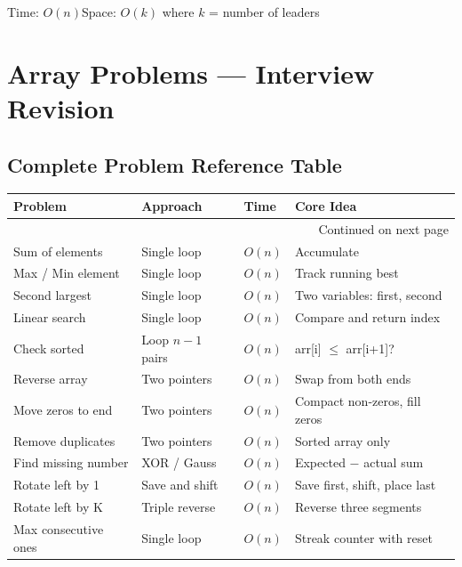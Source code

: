 \documentclass[12pt,a4paper,oneside]{book}
\begin{document}
\begin{complexity}
Time: $O(n)$\quad Space: $O(k)$ where $k$ = number of leaders
\end{complexity}

\chapter{Array Problems --- Interview Revision}

\section{Complete Problem Reference Table}

\begin{longtable}{p{4.3cm}p{2.9cm}p{2.0cm}p{4.1cm}}
\toprule
\textbf{Problem} & \textbf{Approach} & \textbf{Time} & \textbf{Core Idea}\\
\midrule
\endhead
\midrule
\multicolumn{4}{r}{\small Continued on next page}\\
\endfoot
\endlastfoot
Sum of elements          & Single loop      & $O(n)$        & Accumulate\\
Max / Min element        & Single loop      & $O(n)$        & Track running best\\
Second largest           & Single loop      & $O(n)$        & Two variables: first, second\\
Linear search            & Single loop      & $O(n)$        & Compare and return index\\
Check sorted             & Loop $n-1$ pairs & $O(n)$        & arr[i] $\leq$ arr[i+1]?\\
Reverse array            & Two pointers     & $O(n)$        & Swap from both ends\\
Move zeros to end        & Two pointers     & $O(n)$        & Compact non-zeros, fill zeros\\
Remove duplicates        & Two pointers     & $O(n)$        & Sorted array only\\
Find missing number      & XOR / Gauss      & $O(n)$        & Expected $-$ actual sum\\
Rotate left by 1         & Save and shift   & $O(n)$        & Save first, shift, place last\\
Rotate left by K         & Triple reverse   & $O(n)$        & Reverse three segments\\
Max consecutive ones     & Single loop      & $O(n)$        & Streak counter with reset\\

\end{longtable}
\end{document}
